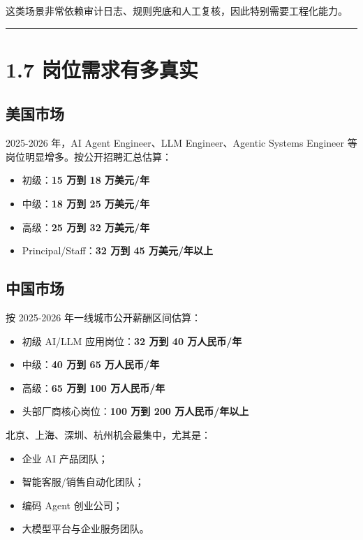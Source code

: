 这类场景非常依赖审计日志、规则兜底和人工复核，因此特别需要工程化能力。


\bigskip\hrule\bigskip

\section{1.7 岗位需求有多真实}

\subsection{美国市场}

2025-2026 年，AI Agent Engineer、LLM Engineer、Agentic Systems Engineer 等岗位明显增多。按公开招聘汇总估算：


\begin{itemize}[leftmargin=2em]
\item 初级：\textbf{15 万到 18 万美元/年}
\item 中级：\textbf{18 万到 25 万美元/年}
\item 高级：\textbf{25 万到 32 万美元/年}
\item Principal/Staff：\textbf{32 万到 45 万美元/年以上}
\end{itemize}

\subsection{中国市场}

按 2025-2026 年一线城市公开薪酬区间估算：


\begin{itemize}[leftmargin=2em]
\item 初级 AI/LLM 应用岗位：\textbf{32 万到 40 万人民币/年}
\item 中级：\textbf{40 万到 65 万人民币/年}
\item 高级：\textbf{65 万到 100 万人民币/年}
\item 头部厂商核心岗位：\textbf{100 万到 200 万人民币/年以上}
\end{itemize}

北京、上海、深圳、杭州机会最集中，尤其是：


\begin{itemize}[leftmargin=2em]
\item 企业 AI 产品团队；
\item 智能客服/销售自动化团队；
\item 编码 Agent 创业公司；
\item 大模型平台与企业服务团队。
\end{itemize}

